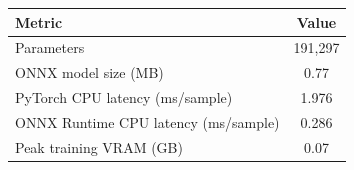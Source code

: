 \begin{tabular}{lc}
\toprule
Metric & Value \\
\midrule
Parameters & 191,297 \\
ONNX model size (MB) & 0.77 \\
PyTorch CPU latency (ms/sample) & 1.976 \\
ONNX Runtime CPU latency (ms/sample) & 0.286 \\
Peak training VRAM (GB) & 0.07 \\
\bottomrule
\end{tabular}
